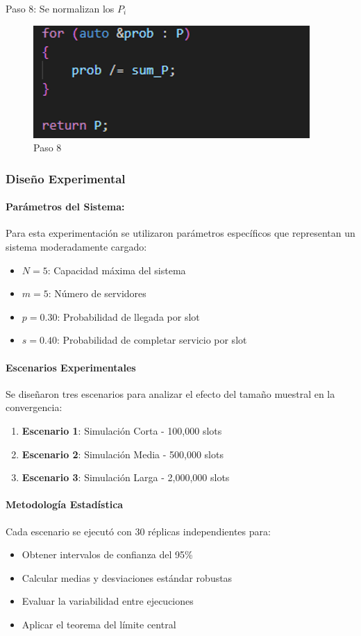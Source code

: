 \documentclass{article}
\begin{document}
Paso 8: Se normalizan los $P_i$
\begin{figure}[H]
    \centering
    \includegraphics[width=0.5\linewidth]{images/imageGeoGeoMCalc9.png}
    \caption{Paso 8}
    \label{fig:enter-label}
\end{figure}

\subsubsection{Diseño Experimental}

\paragraph{Parámetros del Sistema:}

Para esta experimentación se utilizaron parámetros específicos que representan un sistema moderadamente cargado:
\begin{itemize}
    \item $N=5$: Capacidad máxima del sistema
    \item $m=5$: Número de servidores
    \item $p=0.30$: Probabilidad de llegada por slot
    \item $s=0.40$: Probabilidad de completar servicio por slot
\end{itemize}

\paragraph{Escenarios Experimentales}
Se diseñaron tres escenarios para analizar el efecto del tamaño muestral en la convergencia:
\begin{enumerate}
    \item \textbf{Escenario 1}: Simulación Corta - 100,000 slots
    \item \textbf{Escenario 2}: Simulación Media - 500,000 slots
    \item \textbf{Escenario 3}: Simulación Larga - 2,000,000 slots
\end{enumerate}

\paragraph{Metodología Estadística}
Cada escenario se ejecutó con 30 réplicas independientes para:
\begin{itemize}
    \item Obtener intervalos de confianza del 95\%
    \item Calcular medias y desviaciones estándar robustas
    \item Evaluar la variabilidad entre ejecuciones
    \item Aplicar el teorema del límite central
\end{itemize}
\end{document}
